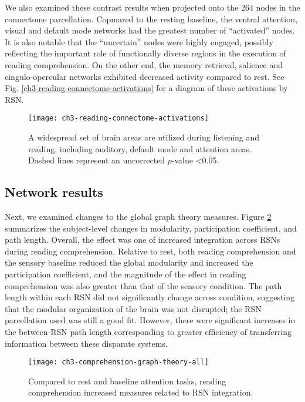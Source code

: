 We also examined these contrast results when projected onto the 264 nodes in the connectome parcellation. Copmared to the resting baseline, the ventral attention, visual and default mode networks had the greatest number of ``activated'' nodes. It is also notable that the ``uncertain'' nodes were highly engaged, possibly reflecting the important role of functionally diverse regions in the execution of reading comprehension. On the other end, the memory retrieval, salience and cingulo-opercular networks exhibited decreased activity compared to rest. See Fig. \ref{ch3-reading-connectome-activations} for a diagram of these activations by RSN. 

\begin{figure}[t]
	\centering
	\texttt{[image: ch3-reading-connectome-activations]}
    \caption[Distribution of reading-related activity among RSN nodes.]{A widespread set of brain areas are utilized during listening and reading, including auditory, default mode and attention areas. Dashed lines represent an uncorrected $p$-value \textless 0.05.}
	\label{fig:ch3-reading-connectome-activations}
\end{figure}


\subsection{Network results}

Next, we examined changes to the global graph theory measures. Figure \ref{fig:ch3-comprehension-graph-theory-all} summarizes the subject-level changes in modularity, participation coefficient, and path length. Overall, the effect was one of increased integration across RSNs during reading comprehension. Relative to rest, both reading comprehension and the sensory baseline reduced the global modularity and increased the participation coefficient, and the magnitude of the effect in reading comprehension was also greater than that of the sensory condition. The path length within each RSN did not significantly change across condition, suggesting that the modular organization of the brain was not disrupted; the RSN parcellation used was still a good fit. However, there were significant increases in the between-RSN path length corresponding to greater efficiency of transferring information between these disparate systems.

\begin{figure}[t]
	\centering
	\texttt{[image: ch3-comprehension-graph-theory-all]}
    \caption[Reading induces more integrated global network architecture.]{Compared to rest and baseline attention tasks, reading comprehension increased measures related to RSN integration.}
	\label{fig:ch3-comprehension-graph-theory-all}
\end{figure}

